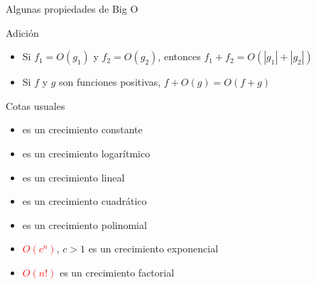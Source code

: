 \documentclass{beamer} %
\newcommand{\red}[1]{\textcolor{red}{#1}}
\newcommand{\green}[1]{{\color{green!70!black}{#1}}}
\begin{document}
\begin{frame}{Algunas propiedades de Big O}
  \begin{block}{Adición}
    \begin{itemize}
      \item<1-> Si $f_1=O(g_1)$ y $f_2=O(g_2)$, entonces $f_1+f_2=O(|g_1|+|g_2|)$
      \item<2-> Si $f$ y $g$ son funciones positivas, $f+O(g)=O(f+g)$\\[2ex]
    \end{itemize}
  \end{block}
\end{frame}

\begin{frame}{Cotas usuales}
   \begin{itemize}
    \item \green{$O(1)$}        \tabto{14ex} es un crecimiento constante
    \item \green{$O(\log n)$}   \tabto{14ex} es un crecimiento logarítmico
    \item \green{$O(n)$}        \tabto{14ex} es un crecimiento lineal
    \item \green{$O(n^2)$}      \tabto{14ex} es un crecimiento cuadrático
    \item \green{$O(n^c)$}      \tabto{14ex} es un crecimiento polinomial
    \item \red{$O(c^n)$}, $c>1$ \tabto{14ex} es un crecimiento exponencial
    \item \red{$O(n!)$}         \tabto{14ex} es un crecimiento factorial
   \end{itemize}
\end{frame}
\end{document}
